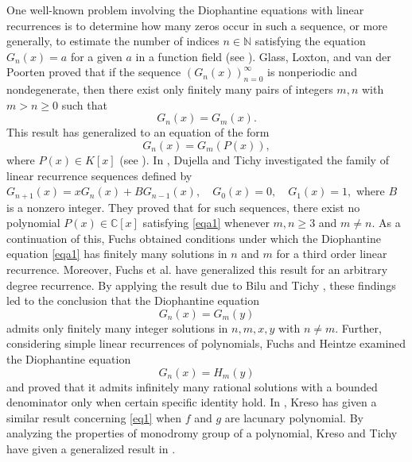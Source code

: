 \documentclass[12pt]{amsart}
\begin{document}
   One well-known problem involving the Diophantine equations with linear recurrences is to determine how many zeros occur in such a sequence, or more generally, to estimate the number of indices $n \in \mathbb{N}$ satisfying the equation $G_n(x) = a$ for a given $a$ in a function field (see \cite{fuchs2005effective}). Glass, Loxton, and van der Poorten \cite{glass1981identifying} proved that if the sequence $(G_n(x))_{n=0}^{\infty}$ is nonperiodic and nondegenerate, 
  then there exist only finitely many pairs of   integers $m, n$ with $m>n\geq 0$ such that
  \begin{equation*}
    G_n(x) = G_m(x).
  \end{equation*} This result has generalized to an equation of the form
  \begin{equation}\label{eqa1}
        G_n(x) = G_m(P(x)),
   \end{equation} where $P(x)\in K[x]$ (see \cite{fuchs2002diophantine}).
   In \cite{dujella2001diophantine}, Dujella and Tichy investigated the family of linear recurrence sequences defined by
   $G_{n+1}(x) = x G_n(x) + B G_{n-1}(x), \quad G_0(x) = 0, \quad G_1(x) = 1,$ 
    where $B$ is a nonzero integer. They proved that for such sequences, there exist no polynomial $P(x) \in \mathbb{C}[x]$ satisfying \eqref{eqa1}
    whenever $m,n \ge 3$ and $m \neq n$. As a continuation of this, Fuchs \cite{fuchs2004diophantine} obtained conditions under which the Diophantine equation \eqref{eqa1} has finitely many solutions in $n$ and $m$ for a third order linear recurrence. Moreover, Fuchs et al. \cite{fuchs2003diophantine} have generalized this result for an arbitrary degree recurrence. 
     By applying the result due to Bilu and Tichy \cite{bilu2000diophantine}, these findings led to the conclusion that the Diophantine equation
    \[
     G_n(x) = G_m(y)
    \]
    admits only finitely many integer solutions in $n,m,x,y$ with $n \neq m$. Further, considering simple linear recurrences of polynomials,  Fuchs and Heintze \cite{fuchs2021diophantine} examined the Diophantine equation
\begin{equation*}\label{eq3}
		G_n(x)=H_m(y)
\end{equation*} and proved that it admits infinitely many rational solutions with a bounded denominator only when certain specific identity hold.
In \cite{kreso2017diophantine}, Kreso has given a similar result concerning \eqref{eq1} when $f$ and $g$ are lacunary polynomial. By analyzing the properties of monodromy group of a polynomial, Kreso and Tichy have given a generalized result in \cite{kreso2018diophantine}.  
	
\end{document}
